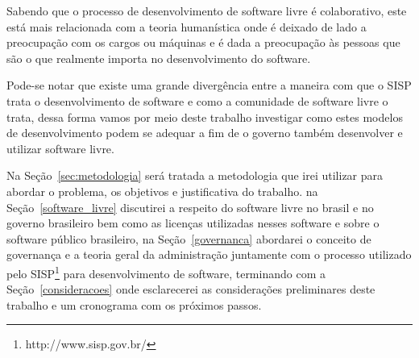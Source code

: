 Sabendo que o processo de desenvolvimento de software livre é colaborativo, este 
está mais relacionada com a teoria humanística onde é deixado de lado a preocupação
com os cargos ou máquinas e é dada a preocupação às pessoas que são o que realmente
importa no desenvolvimento do software.

Pode-se notar que existe uma grande divergência entre a maneira com que o SISP trata
o desenvolvimento de software e como a comunidade de software livre o trata, dessa forma vamos
por meio deste trabalho investigar como estes modelos de desenvolvimento podem 
se adequar a fim de o governo também desenvolver e utilizar software livre.

Na Seção~\ref{sec:metodologia} será tratada a metodologia que irei utilizar para abordar o 
problema, os objetivos e justificativa do trabalho.
%
na Seção~\ref{software_livre} discutirei a respeito do software livre no brasil e no governo 
brasileiro bem como as licenças utilizadas nesses software e sobre o software público 
brasileiro,
%
na Seção~\ref{governanca} abordarei o conceito de governança e a teoria geral
da administração juntamente com o processo utilizado pelo SISP\footnote{http://www.sisp.gov.br/}
para desenvolvimento de software,
%
terminando com a Seção~\ref{consideracoes} onde esclarecerei as considerações preliminares 
deste trabalho e um cronograma com os próximos passos. 


